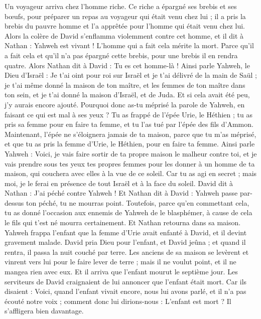 \begin{multicols}{2}
Un voyageur arriva chez l'homme riche. Ce riche a épargné ses brebis et ses bœufs, pour préparer un repas au voyageur qui était venu chez lui ; il a pris la brebis du pauvre homme et l'a apprêtée pour l'homme qui était venu chez lui.
Alors la colère de David s'enflamma violemment contre cet homme, et il dit à Nathan : Yahweh est vivant ! L'homme qui a fait cela mérite la mort.
Parce qu'il a fait cela et qu'il n'a pas épargné cette brebis, pour une brebis il en rendra quatre.
Alors Nathan dit à David : Tu es cet homme-là ! Ainsi parle Yahweh, le Dieu d'Israël : Je t'ai oint pour roi sur Israël et je t'ai délivré de la main de Saül ;
je t'ai même donné la maison de ton maître, et les femmes de ton maître dans ton sein, et je t'ai donné la maison d'Israël, et de Juda. Et si cela avait été peu, j'y aurais encore ajouté.
Pourquoi donc as-tu méprisé la parole de Yahweh, en faisant ce qui est mal à ses yeux ? Tu as frappé de l'épée Urie, le Héthien ; tu as pris sa femme pour en faire ta femme, et tu l'as tué par l'épée des fils d'Ammon.
Maintenant, l'épée ne s'éloignera jamais de ta maison, parce que tu m'as méprisé, et que tu as pris la femme d'Urie, le Héthien, pour en faire ta femme.
Ainsi parle Yahweh : Voici, je vais faire sortir de ta propre maison le malheur contre toi, et je vais prendre sous tes yeux tes propres femmes pour les donner à un homme de ta maison, qui couchera avec elles à la vue de ce soleil.
Car tu as agi en secret ; mais moi, je le ferai en présence de tout Israël et à la face du soleil.
David dit à Nathan : J'ai péché contre Yahweh ! Et Nathan dit à David : Yahweh passe par-dessus ton péché, tu ne mourras point.
Toutefois, parce qu'en commettant cela, tu as donné l'occasion aux ennemis de Yahweh de le blasphémer, à cause de cela le fils qui t'est né mourra certainement.
Et Nathan retourna dans sa maison. Yahweh frappa l'enfant que la femme d'Urie avait enfanté à David, et il devint gravement malade.
David pria Dieu pour l'enfant, et David jeûna ; et quand il rentra, il passa la nuit couché par terre.
Les anciens de sa maison se levèrent et vinrent vers lui pour le faire lever de terre ; mais il ne voulut point, et il ne mangea rien avec eux.
Et il arriva que l'enfant mourut le septième jour. Les serviteurs de David craignaient de lui annoncer que l'enfant était mort. Car ils disaient : Voici, quand l'enfant vivait encore, nous lui avons parlé, et il n'a pas écouté notre voix ; comment donc lui dirions-nous : L'enfant est mort ? Il s'affligera bien davantage.

\end{multicols}
